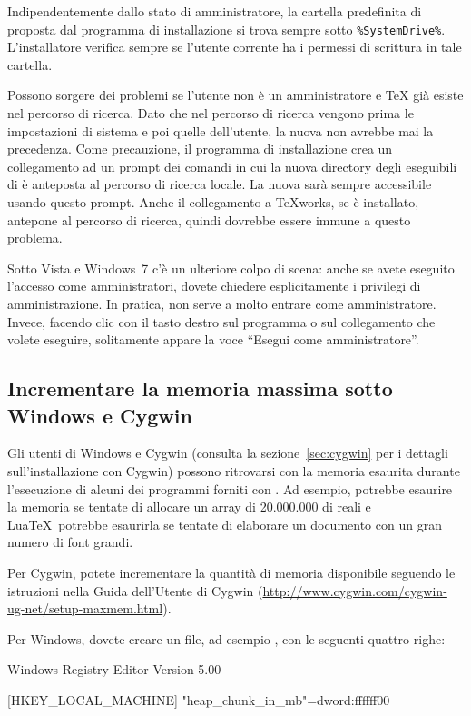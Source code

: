 \documentclass{article}
\begin{document}
Indipendentemente dallo stato di amministratore, la cartella predefinita
di \TL{} proposta dal programma di installazione si trova sempre sotto
\verb|%SystemDrive%|. L'installatore verifica sempre se l'utente corrente
ha i permessi di scrittura in tale cartella.

Possono sorgere dei problemi se l'utente non è un amministratore e \TeX{}
già esiste nel percorso di ricerca. Dato che nel percorso di ricerca
vengono prima le impostazioni di sistema e poi quelle dell'utente, la
nuova \TL{} non avrebbe mai la precedenza. Come precauzione, il programma
di installazione crea un collegamento ad un prompt dei comandi in cui la
nuova directory degli eseguibili di \TL{} è anteposta al percorso di
ricerca locale. La nuova \TL{} sarà sempre accessibile usando questo
prompt. Anche il collegamento a \TeX{}works, se è installato, antepone
\TL{} al percorso di ricerca, quindi dovrebbe essere immune a questo
problema.

Sotto Vista e Windows~7 c'è un ulteriore colpo di scena: anche se avete
eseguito l'accesso come amministratori, dovete chiedere esplicitamente i
privilegi di amministrazione. In pratica, non serve a molto entrare come
amministratore. Invece, facendo clic con il tasto destro sul programma o
sul collegamento che volete eseguire, solitamente appare la voce ``Esegui
come amministratore''.

\subsection{Incrementare la memoria massima sotto Windows e Cygwin}
\label{sec:cygwin-maxmem}

Gli utenti di Windows e Cygwin (consulta la sezione~\ref{sec:cygwin} per i
dettagli sull'installazione con Cygwin) possono ritrovarsi con la memoria
esaurita durante l'esecuzione di alcuni dei programmi forniti con \TL. Ad
esempio,  potrebbe esaurire la memoria se tentate di allocare un
array di 20.000.000 di reali e Lua\TeX\ potrebbe esaurirla se tentate di
elaborare un documento con un gran numero di font grandi.

Per Cygwin, potete incrementare la quantità di memoria disponibile seguendo
le istruzioni nella Guida dell'Utente di Cygwin
(\url{http://www.cygwin.com/cygwin-ug-net/setup-maxmem.html}).

Per Windows, dovete creare un file, ad esempio , con le
seguenti quattro righe:

\begin{sverbatim}
Windows Registry Editor Version 5.00

[HKEY_LOCAL_MACHINE\Software\Cygwin]
"heap_chunk_in_mb"=dword:ffffff00
\end{sverbatim}
\end{document}
